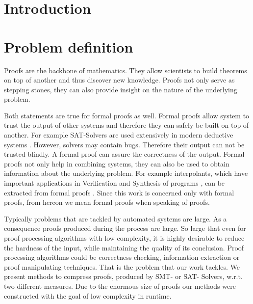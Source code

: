 \section{Introduction}

\section{Problem definition}

Proofs are the backbone of mathematics. 
They allow scientists to build theorems on top of another and thus discover new knowledge.
Proofs not only serve as stepping stones, they can also provide insight on the nature of the underlying problem.

Both statements are true for formal proofs as well.
Formal proofs allow system to trust the output of other systems and therefore they can safely be built on top of another. 
For example SAT-Solvers are used extensively in modern deductive systems \cite{Biere2009}. 
However, solvers may contain bugs. 
Therefore their output can not be trusted blindly.
A formal proof can assure the correctness of the output.
Formal proofs not only help in combining systems, they can also be used to obtain information about the underlying problem.
For example interpolants, which have important applications in Verification and Synthesis of programs \cite{McMill2005}, can be extracted from formal proofs \cite{Hofferek2013}.
Since this work is concerned only with formal proofs, from hereon we mean formal proofs when speaking of proofs.

Typically problems that are tackled by automated systems are large. 
As a consequence proofs produced during the process are large.
So large that even for proof processing algorithms with low complexity, it is highly desirable to reduce the hardness of the input, while maintaining the quality of its conclusion.
Proof processing algorithms could be correctness checking, information extraction or proof manipulating techniques.
That is the problem that our work tackles.
We present methods to compress proofs, produced by SMT- or SAT- Solvers, w.r.t. two different measures.
Due to the enormous size of proofs our methods were constructed with the goal of low complexity in runtime.

